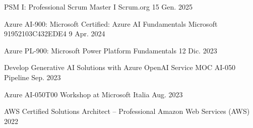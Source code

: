 

\begin{cvhonors}

  \cvhonor
  {PSM I: Professional Scrum Master I} %
  {Scrum.org} %
  {} %
  {15 Gen. 2025} %

  \cvhonor
    {Azure AI-900: Microsoft Certified: Azure AI Fundamentals} %
    {Microsoft} %
    {91952103C432EDE4} %
    {9 Apr. 2024} %

  \cvhonor
    {Azure PL-900: Microsoft Power Platform Fundamentals} %
    {} %
    {} %
    {12 Dic. 2023} %

  \cvhonor
    {Develop Generative AI Solutions with Azure OpenAI Service MOC AI-050} %
    {Pipeline} %
    {} %
    {Sep. 2023} %

  \cvhonor
    {Azure AI-050T00} %
    {Workshop at Microsoft Italia} %
    {} %
    {Aug. 2023} %

  \cvhonor
    {AWS Certified Solutions Architect – Professional} %
    {Amazon Web Services (AWS)} %
    {} %
    {2022} %


\end{cvhonors}
